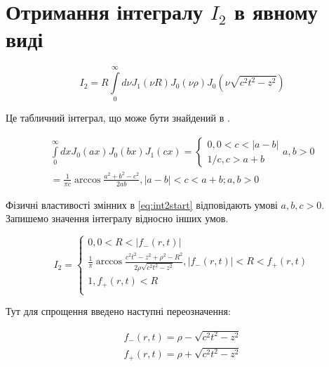 \section{Отримання інтегралу $ I_2 $ в явному виді} \label{sec:i2anal}

\begin{equation} \label{eq:int2start}
I_2 = R \int \limits_{0}^{\infty} d \nu J_1 \left( \nu R \right) 
J_0 \left( \nu \rho \right) J_0 \left( \nu \sqrt{c^2t^2 - z^2} \right)
\end{equation}

Це табличний інтеграл, що може бути знайдений в 
\cite[ст. 228]{imp:SpecFunc1983}.

\begin{equation} \begin{aligned} \label{eq:intJ0J0J1tabel}
\int \limits_{0}^{\infty} d x J_0 \left( ax \right) 
J_0 \left( bx \right) J_1 \left( cx \right) = \begin{cases}
0, 0 < c < | a - b | \\ 
1/c, c > a + b
\end{cases} a, b > 0 \\
= \frac{1}{\pi c} \arccos \frac{a^2 + b^2 - c^2}{2ab},
| a - b | < c < a + b; a,b > 0
\end{aligned} \end{equation}

Фізичні властивості змінних в \eqref{eq:int2start} відповідають умові 
$ a,b,c > 0 $. Запишемо значення інтегралу відносно інших умов.

\begin{equation}
I_2 = \begin{cases}
0, 0 < R < | f_{-} \left( r, t \right) | \\
\frac{1}{\pi} \arccos \frac{c^2t^2 - z^2 + \rho^2 - R^2}
{2 \rho \sqrt{c^2t^2 - z^2}}, | f_{-} \left( r, t \right) | < R < 
f_{+} \left( r, t \right) \\ 1, f_{+} \left( r, t \right) < R \\
\end{cases}
\end{equation}

Тут для спрощення введено наступні переозначення:

\begin{equation*} \begin{aligned}
f_{-} \left( r, t \right) = \rho - \sqrt{c^2t^2 - z^2} \\
f_{+} \left( r, t \right) = \rho + \sqrt{c^2t^2 - z^2}
\end{aligned} \end{equation*}

